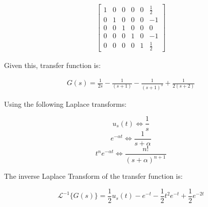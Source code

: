 \documentclass[12pt, letterpaper]{../assignment}
\begin{document}
\begin{equation*}
    \begin{aligned}
        \left[\begin{array}{ccccc|c} 
            1 & 0 & 0 & 0 & 0 & \frac{1}{2}\\
            0 & 1 & 0 & 0 & 0 & -1\\
            0 & 0 & 1 & 0 & 0 & 0\\
            0 & 0 & 0 & 1 & 0 & -1\\
            0 & 0 & 0 & 0 & 1 & \frac{1}{2}
        \end{array}\right]
    \end{aligned}
\end{equation*}

Given this, transfer function is:

\begin{equation*}
    \begin{aligned}
        G(s) = \frac{1}{2 s} - \frac{1}{(s+1)} - \frac{1}{(s+1)^3} + \frac{1}{2(s+2)}
    \end{aligned}
\end{equation*}

Using the following Laplace transforms:

$$ u_s(t) \Leftrightarrow \frac{1}{s} $$
$$ e^{-\alpha t} \Leftrightarrow \frac{1}{s+\alpha} $$
$$ t^n e^{-\alpha t} \Leftrightarrow \frac{n!}{(s+\alpha)^{n+1}} $$

The inverse Laplace Transform of the transfer function is:
\begin{answer}
$$ \mathcal{L}^{-1} \{G(s)\} =  \frac{1}{2} u_s(t) - e^{- t} - \frac{1}{2} t^2 e^{- t} + \frac{1}{2} e^{-2 t} $$
\end{answer}
\end{document}
